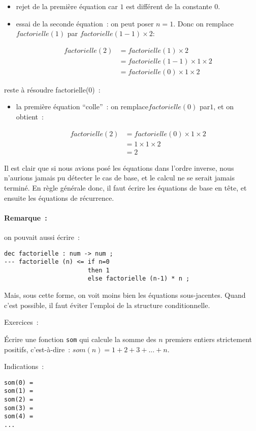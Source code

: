 \begin{itemize}
\item rejet de la première équation car $1$ est différent de la constante $0$.
\item essai de la seconde équation~: on peut poser $n=1$. Donc on remplace
$ factorielle(1)$ par $ factorielle(1-1)\times 2 $:

$$\begin{array}{rl}
factorielle(2) &= factorielle(1)\times 2 \\
		&= factorielle(1-1)\times 1\times 2 \\\
	& = factorielle(0)\times 1\times 2
\end{array}$$
\end{itemize}
reste à résoudre factorielle(0)~:
\begin{itemize}
\item la première équation ``colle''~: on remplace$ factorielle(0)$ par$ 1$, et on obtient~:

$$\begin{array}{rl}
factorielle(2)  &= factorielle(0)\times 1\times 2 \\
&= 1\times 1\times 2 \\
&= 2
\end{array}$$
\end{itemize}

Il est clair que si nous avions posé les équations dans l'ordre
inverse, nous n'aurions jamais pu détecter le cas de base, et le
calcul ne se serait jamais terminé.  En règle générale donc, il faut
écrire les équations de base en t\^ete, et ensuite les équations de
récurrence.


\paragraph{Remarque~: }on pouvait aussi écrire~:

\begin{verbatim}
dec factorielle : num -> num ;
--- factorielle (n) <= if n=0 
                       then 1 
                       else factorielle (n-1) * n ;
\end{verbatim}

Mais, sous cette forme, on voit moins bien les équations
sous-jacentes. Quand c'est possible, il faut éviter l'emploi de la
structure conditionnelle.


Exercices~:
\begin{exercice}
 Écrire une fonction \texttt{som} qui calcule la somme des $n$ premiers entiers strictement positifs, c'est-à-dire~:	$som(n) =   1+2+3+...+n $.

Indications~:
\begin{verbatim}
som(0) =
som(1) =
som(2) =
som(3) =
som(4) =
...
\end{verbatim}
\end{exercice}






